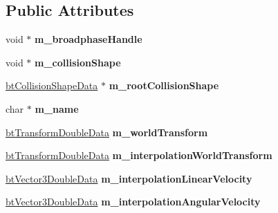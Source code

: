 \subsection*{Public Attributes}
\begin{DoxyCompactItemize}
\item 
\mbox{\label{structbtCollisionObjectDoubleData_ae8df24b26556947965c1646c6172e54c}} 
void $\ast$ {\bfseries m\+\_\+broadphase\+Handle}
\item 
\mbox{\label{structbtCollisionObjectDoubleData_a8ac50053cbd222386d6cb485f50567f3}} 
void $\ast$ {\bfseries m\+\_\+collision\+Shape}
\item 
\mbox{\label{structbtCollisionObjectDoubleData_abcf39e9bfc408b540de3433ca9efa6ae}} 
\hyperlink{structbtCollisionShapeData}{bt\+Collision\+Shape\+Data} $\ast$ {\bfseries m\+\_\+root\+Collision\+Shape}
\item 
\mbox{\label{structbtCollisionObjectDoubleData_aacda4d2339567315439a81b0c20e8947}} 
char $\ast$ {\bfseries m\+\_\+name}
\item 
\mbox{\label{structbtCollisionObjectDoubleData_aac64a624d8b06347b2c76c1f726ab3f4}} 
\hyperlink{structbtTransformDoubleData}{bt\+Transform\+Double\+Data} {\bfseries m\+\_\+world\+Transform}
\item 
\mbox{\label{structbtCollisionObjectDoubleData_a723c53e394ee285019d9c50c54ec0d64}} 
\hyperlink{structbtTransformDoubleData}{bt\+Transform\+Double\+Data} {\bfseries m\+\_\+interpolation\+World\+Transform}
\item 
\mbox{\label{structbtCollisionObjectDoubleData_a26ecc4cca65975abc761fe414fa50d3d}} 
\hyperlink{structbtVector3DoubleData}{bt\+Vector3\+Double\+Data} {\bfseries m\+\_\+interpolation\+Linear\+Velocity}
\item 
\mbox{\label{structbtCollisionObjectDoubleData_ab967cba398686d5e96f48431fa71f70e}} 
\hyperlink{structbtVector3DoubleData}{bt\+Vector3\+Double\+Data} {\bfseries m\+\_\+interpolation\+Angular\+Velocity}

\end{DoxyCompactItemize}
